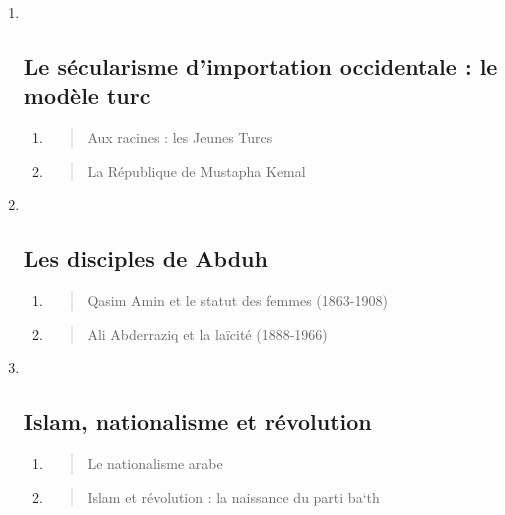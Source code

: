 \begin{enumerate}
\def\labelenumi{\Roman{enumi}.}
\item ~
  \hypertarget{le-suxe9cularisme-dimportation-occidentale-le-moduxe8le-turc}{%
  \subsection{\texorpdfstring{{Le sécularisme d'importation
  occidentale : le modèle
  turc}}{Le sécularisme d'importation occidentale : le modèle turc}}\label{le-suxe9cularisme-dimportation-occidentale-le-moduxe8le-turc}}

  \begin{enumerate}
  \def\labelenumii{\arabic{enumii}.}
  \item
    \begin{quote}
    Aux racines : les Jeunes Turcs
    \end{quote}
  \item
    \begin{quote}
    La République de Mustapha Kemal
    \end{quote}
  \end{enumerate}
\item ~
  \hypertarget{les-disciples-de-abduh}{%
  \subsection{\texorpdfstring{{Les disciples de
  Abduh}}{Les disciples de Abduh}}\label{les-disciples-de-abduh}}

  \begin{enumerate}
  \def\labelenumii{\arabic{enumii}.}
  \item
    \begin{quote}
    Qasim Amin et le statut des femmes (1863-1908)
    \end{quote}
  \item
    \begin{quote}
    Ali Abderraziq et la laïcité (1888-1966)
    \end{quote}
  \end{enumerate}
\item ~
  \hypertarget{islam-nationalisme-et-ruxe9volution}{%
  \subsection{\texorpdfstring{{Islam, nationalisme et
  révolution}}{Islam, nationalisme et révolution}}\label{islam-nationalisme-et-ruxe9volution}}

  \begin{enumerate}
  \def\labelenumii{\arabic{enumii}.}
  \item
    \begin{quote}
    Le nationalisme arabe
    \end{quote}
  \item
    \begin{quote}
    Islam et révolution : la naissance du parti ba`th
    \end{quote}
  \end{enumerate}
\end{enumerate}

